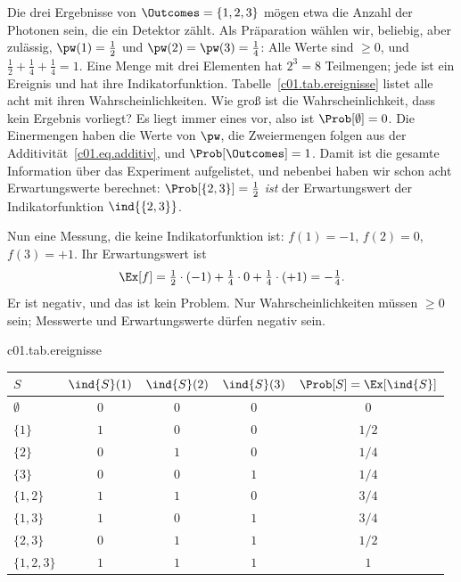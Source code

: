 \begin{example}\label{c01.ex.drei-ergebnisse}
  Die drei Ergebnisse von $\Outcomes = \{1, 2, 3\}$ mögen etwa die Anzahl der Photonen sein,
  die ein Detektor zählt. Als Präparation wählen wir, beliebig, aber zulässig,
  $\pw(1) = \tfrac12$ und $\pw(2) = \pw(3) = \tfrac14$: Alle Werte sind $\geq 0$, und
  $\tfrac12 + \tfrac14 + \tfrac14 = 1$. Eine Menge mit drei Elementen hat $2^3 = 8$
  Teilmengen; jede ist ein Ereignis und hat ihre Indikatorfunktion.
  Tabelle~\ref{c01.tab.ereignisse} listet alle acht mit ihren Wahrscheinlichkeiten. Wie groß
  ist die Wahrscheinlichkeit, dass kein Ergebnis vorliegt? Es liegt immer eines vor, also
  ist $\Prob[\emptyset] = 0$. Die Einermengen haben die Werte von $\pw$, die Zweiermengen
  folgen aus der Additivität~\eqref{c01.eq.additiv}, und $\Prob[\Outcomes] = 1$. Damit ist
  die gesamte Information über das Experiment aufgelistet, und nebenbei haben wir schon acht
  Erwartungswerte berechnet: $\Prob[\{2,3\}] = \tfrac12$ \emph{ist} der Erwartungswert der
  Indikatorfunktion $\ind{\{2,3\}}$.

  Nun eine Messung, die keine Indikatorfunktion ist: $f(1) = -1$, $f(2) = 0$, $f(3) = +1$.
  Ihr Erwartungswert ist
  \begin{equation}\label{c01.eq.drei-ergebnisse}
    \Ex[f] = \tfrac12\cdot(-1) + \tfrac14\cdot 0 + \tfrac14\cdot(+1) = -\tfrac14 .
  \end{equation}
  Er ist negativ, und das ist kein Problem. Nur Wahrscheinlichkeiten müssen $\geq 0$ sein;
  Messwerte und Erwartungswerte dürfen negativ sein.
\end{example}

\begin{tpctable}{c01.tab.ereignisse}
  \caption{Alle acht Ereignisse des Experiments aus Beispiel~\ref{c01.ex.drei-ergebnisse},
    mit den Werten ihrer Indikatorfunktion an den Stellen $1$, $2$, $3$ und ihrer
    Wahrscheinlichkeit für $\pw = (\tfrac12, \tfrac14, \tfrac14)$. Jede Zeile ist eine
    Ja-Nein-Messung und ihr Erwartungswert.}
  \begin{tabular}{lcccc}
    \toprule
    $S$ & $\ind{S}(1)$ & $\ind{S}(2)$ & $\ind{S}(3)$ & $\Prob[S] = \Ex[\ind{S}]$ \\
    \midrule
    $\emptyset$ & $0$ & $0$ & $0$ & $0$ \\
    $\{1\}$ & $1$ & $0$ & $0$ & $1/2$ \\
    $\{2\}$ & $0$ & $1$ & $0$ & $1/4$ \\
    $\{3\}$ & $0$ & $0$ & $1$ & $1/4$ \\
    $\{1, 2\}$ & $1$ & $1$ & $0$ & $3/4$ \\
    $\{1, 3\}$ & $1$ & $0$ & $1$ & $3/4$ \\
    $\{2, 3\}$ & $0$ & $1$ & $1$ & $1/2$ \\
    $\{1, 2, 3\}$ & $1$ & $1$ & $1$ & $1$ \\
    \bottomrule
  \end{tabular}
\end{tpctable}

